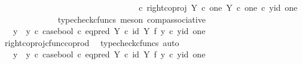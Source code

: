 \begin{isabellebody}
\ \ \ \ \ \ \ \ \ \ \ \ \ \ \ \ \ \ \ \ \ \ \ \ \ \ \ \ \ \ \ \ \ {\isasymcirc}\isactrlsub c\ right{\isacharunderscore}{\kern0pt}coproj\ {\isacharparenleft}{\kern0pt}Y\ {\isasymtimes}\isactrlsub c\ one{\isacharparenright}{\kern0pt}\ {\isacharparenleft}{\kern0pt}Y\ {\isasymtimes}\isactrlsub c\ one{\isacharparenright}{\kern0pt}{\isacharparenright}{\kern0pt}\ {\isasymcirc}\isactrlsub c\ {\isasymlangle}y{}{\isacharcomma}{\kern0pt}id\ one{\isasymrangle}{\isachardoublequoteclose}\isanewline
\ \ \ \ \ \ \ \ \ \ \ \ \isamarkupfalse%
\ {\isacharparenleft}{\kern0pt}typecheck{\isacharunderscore}{\kern0pt}cfuncs{\isacharcomma}{\kern0pt}\ meson\ comp{\isacharunderscore}{\kern0pt}associative{}{\isacharparenright}{\kern0pt}\isanewline
\ \ \ \ \ \ \ \ \ \ \isamarkupfalse%
\ \isamarkupfalse%
\ {\isachardoublequoteopen}{\isachardot}{\kern0pt}{\isachardot}{\kern0pt}{\isachardot}{\kern0pt}\ {\isacharequal}{\kern0pt}\ {\isacharparenleft}{\kern0pt}{\isacharparenleft}{\kern0pt}y{}\ {\isasymamalg}\ y{}{\isacharparenright}{\kern0pt}\ {\isasymcirc}\isactrlsub c\ case{\isacharunderscore}{\kern0pt}bool\ {\isasymcirc}\isactrlsub c\ eq{\isacharunderscore}{\kern0pt}pred\ Y\ {\isasymcirc}\isactrlsub c\ {\isacharparenleft}{\kern0pt}id\ Y\ {\isasymtimes}\isactrlsub f\ y{}{\isacharparenright}{\kern0pt}{\isacharparenright}{\kern0pt}\ {\isasymcirc}\isactrlsub c\ {\isasymlangle}y{}{\isacharcomma}{\kern0pt}id\ one{\isasymrangle}{\isachardoublequoteclose}\isanewline
\ \ \ \ \ \ \ \ \ \ \ \ \isamarkupfalse%
\ right{\isacharunderscore}{\kern0pt}coproj{\isacharunderscore}{\kern0pt}cfunc{\isacharunderscore}{\kern0pt}coprod\ \isamarkupfalse%
\ {\isacharparenleft}{\kern0pt}typecheck{\isacharunderscore}{\kern0pt}cfuncs{\isacharcomma}{\kern0pt}\ auto{\isacharparenright}{\kern0pt}\isanewline
\ \ \ \ \ \ \ \ \ \ \isamarkupfalse%
\ \isamarkupfalse%
\ {\isachardoublequoteopen}{\isachardot}{\kern0pt}{\isachardot}{\kern0pt}{\isachardot}{\kern0pt}\ {\isacharequal}{\kern0pt}\ {\isacharparenleft}{\kern0pt}y{}\ {\isasymamalg}\ y{}{\isacharparenright}{\kern0pt}\ {\isasymcirc}\isactrlsub c\ case{\isacharunderscore}{\kern0pt}bool\ {\isasymcirc}\isactrlsub c\ eq{\isacharunderscore}{\kern0pt}pred\ Y\ {\isasymcirc}\isactrlsub c\ {\isacharparenleft}{\kern0pt}id\ Y\ {\isasymtimes}\isactrlsub f\ y{}{\isacharparenright}{\kern0pt}\ {\isasymcirc}\isactrlsub c\ {\isasymlangle}y{}{\isacharcomma}{\kern0pt}id\ one{\isasymrangle}{\isachardoublequoteclose}\isanewline

\end{isabellebody}
